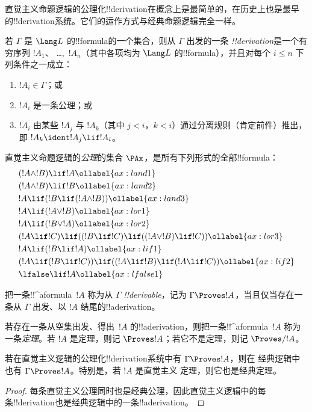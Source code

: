 \documentclass[../../../include/open-logic-section]{subfiles}
\begin{document}


直觉主义命题逻辑的公理化!!{derivation}在概念上是最简单的，在历史上也是最早的!!{derivation}系统。它们的运作方式与经典命题逻辑完全一样。

\begin{defn}[!!^{derivability}]
若 $\Gamma$ 是 $\Lang L$ 的!!{formula}的一个集合，则从 $\Gamma$ 出发的一条
\emph{!!{derivation}}是一个有穷序列 $!A_1$、
\dots,~$!A_n$（其中各项均为 $\Lang L$ 的!!{formula}），并且对每个 $i \le n$ 下列条件之一成立：
\begin{enumerate}
\item $!A_i \in \Gamma$；或
\item $!A_i$ 是一条公理；或
\item $!A_i$ 由某些 $!A_j$ 与 $!A_k$（其中 $j < i$，$k <
  i$）通过分离规则（肯定前件）推出，即 $!A_k \ident !A_j \lif !A_i$。
\end{enumerate}
\end{defn}

\begin{defn}[公理]
直觉主义命题逻辑的\emph{公理}的集合 $\PAx$，是所有下列形式的全部!!{formula}：
\begin{align}
  & (!A \land !B) \lif !A \ollabel{ax:land1}\\
  & (!A \land !B) \lif !B \ollabel{ax:land2}\\
  & !A \lif (!B \lif (!A \land !B)) \ollabel{ax:land3}\\
  & !A \lif (!A \lor !B) \ollabel{ax:lor1}\\
  & !A \lif (!B \lor !A) \ollabel{ax:lor2}\\
  & (!A \lif !C) \lif ((!B \lif !C) \lif ((!A \lor !B) \lif !C)) \ollabel{ax:lor3}\\
  & !A \lif (!B \lif !A) \ollabel{ax:lif1}\\
  & (!A \lif (!B \lif !C)) \lif ((!A \lif !B) \lif (!A \lif !C)) \ollabel{ax:lif2}\\
  & \lfalse \lif !A \ollabel{ax:lfalse1}
\end{align}
\end{defn}

\begin{defn}[!!^{derivability}]
把一条!!^a{formula}~$!A$ 称为从 $\Gamma$ \emph{!!{derivable}}，记为
$\Gamma \Proves !A$，当且仅当存在一条从 $\Gamma$ 出发、以
$!A$ 结尾的!!a{derivation}。
\end{defn}

\begin{defn}[定理]
若存在一条从空集出发、得出~$!A$ 的!!a{derivation}，则把一条!!^a{formula}~$!A$ 称为一条\emph{定理}。若 $!A$ 是定理，则记 $\Proves !A$；若它不是定理，则记 $\Proves/ !A$。
\end{defn}

\begin{prop}
  若在直觉主义逻辑的公理化!!{derivation}系统中有 $\Gamma \Proves !A$，则在
  经典逻辑中也有 $\Gamma \Proves !A$。特别是，若 $!A$ 是直觉主义
  定理，则它也是经典定理。
\end{prop}

\begin{proof}
  每条直觉主义公理同时也是经典公理，因此直觉主义逻辑中的每条!!{derivation}也是经典逻辑中的一条!!a{derivation}。
\end{proof}
\end{document}
